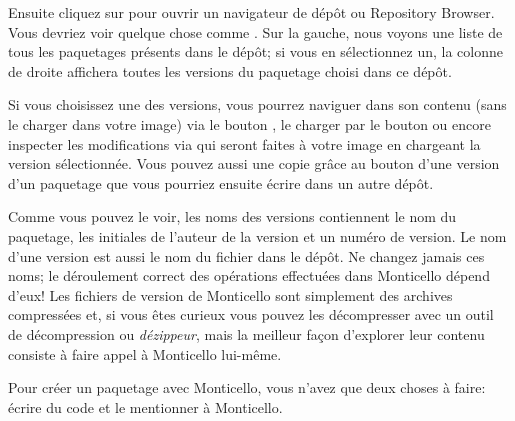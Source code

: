 \documentclass[a4paper,10pt,twoside]{book}
\begin{document}
Ensuite cliquez sur  pour ouvrir un navigateur de d\'ep\^ot ou
Repository Browser. Vous devriez voir quelque chose comme
 .  
Sur la gauche, nous voyons une liste de tous les paquetages pr\'esents dans le
d\'ep\^ot; si vous en s\'electionnez un, la colonne de droite affichera
toutes les versions du paquetage choisi dans ce d\'ep\^ot.

Si vous choisissez une des versions, vous pourrez naviguer dans son contenu (sans le charger dans votre image) via le bouton , le charger
par le bouton  ou encore inspecter les modifications
via  qui seront faites \`a votre image en chargeant la version
s\'electionn\'ee. Vous pouvez aussi une copie gr\^ace au bouton 
d'une version d'un paquetage que vous pourriez ensuite \'ecrire dans un
autre d\'ep\^ot.

Comme vous pouvez le voir, les noms des versions contiennent le nom du paquetage, les initiales de l'auteur de la version et un num\'ero de version.
Le nom d'une version est aussi le nom du fichier dans le d\'ep\^ot. Ne
changez jamais ces noms; le d\'eroulement correct des op\'erations
effectu\'ees dans Monticello d\'epend d'eux!
Les fichiers de version de Monticello sont simplement des archives compress\'ees
 et, si vous \^etes curieux vous pouvez les d\'ecompresser avec un outil 
de d\'ecompression ou \emph{d\'ezippeur}, mais la meilleur fa\c{c}on 
d'explorer leur contenu consiste \`a faire appel \`a Monticello lui-m\^eme.

Pour cr\'eer un paquetage avec Monticello, vous n'avez que deux choses \`a faire:
\'ecrire du code et le mentionner \`a Monticello.

\end{document}
